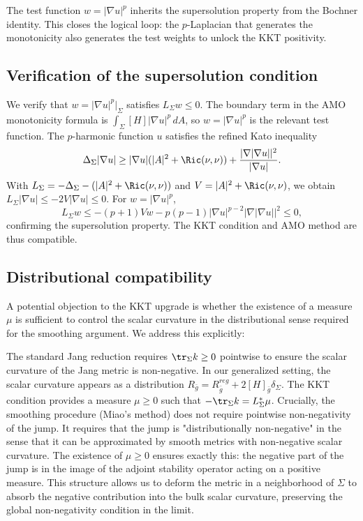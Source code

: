 The test function $w = |\nabla u|^p$ inherits the supersolution property from the Bochner identity. This closes the logical loop: the $p$-Laplacian that generates the monotonicity also generates the test weights to unlock the KKT positivity.

\subsection{Verification of the supersolution condition}
\label{subsec:Verification_KKT}

We verify that $w = |\nabla u|^p|_\Sigma$ satisfies $L_\Sigma w \le 0$. The boundary term in the AMO monotonicity formula is $\int_\Sigma [H] |\nabla u|^p \, dA$, so $w = |\nabla u|^p$ is the relevant test function. The $p$-harmonic function $u$ satisfies the refined Kato inequality
\[
\Delta_\Sigma |\nabla u| \ge |\nabla u| (|A|^2 + \Ric(\nu, \nu)) + \frac{|\nabla |\nabla u||^2}{|\nabla u|}.
\]
With $L_\Sigma = -\Delta_\Sigma - (|A|^2 + \Ric(\nu, \nu))$ and $V = |A|^2 + \Ric(\nu,\nu)$, we obtain $L_\Sigma |\nabla u| \le -2V|\nabla u| \le 0$. For $w = |\nabla u|^p$,
\[
L_\Sigma w \le -(p+1) V w - p(p-1) |\nabla u|^{p-2} |\nabla |\nabla u||^2 \le 0,
\]
confirming the supersolution property. The KKT condition and AMO method are thus compatible.

\subsection{Distributional compatibility}

A potential objection to the KKT upgrade is whether the existence of a measure $\mu$ is sufficient to control the scalar curvature in the distributional sense required for the smoothing argument. We address this explicitly:

\begin{remark}
The standard Jang reduction requires $\tr_\Sigma k \ge 0$ pointwise to ensure the scalar curvature of the Jang metric is non-negative. In our generalized setting, the scalar curvature appears as a distribution $R_{\bar{g}} = R_{\bar{g}}^{reg} + 2[H]_{\bar{g}} \delta_\Sigma$.
The KKT condition provides a measure $\mu \ge 0$ such that $-\tr_\Sigma k = L_\Sigma^* \mu$.
Crucially, the smoothing procedure (Miao's method) does not require pointwise non-negativity of the jump. It requires that the jump is "distributionally non-negative" in the sense that it can be approximated by smooth metrics with non-negative scalar curvature.
The existence of $\mu \ge 0$ ensures exactly this: the negative part of the jump is in the image of the adjoint stability operator acting on a positive measure. This structure allows us to deform the metric in a neighborhood of $\Sigma$ to absorb the negative contribution into the bulk scalar curvature, preserving the global non-negativity condition in the limit.
\end{remark}
